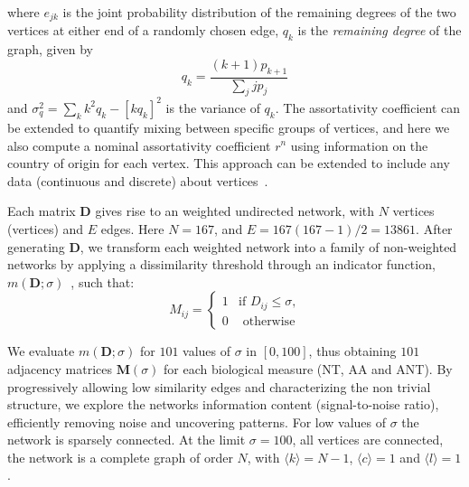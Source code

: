 \documentclass[12pt]{article}
\begin{document}
where $e_{jk}$ is the joint probability distribution of the remaining degrees of the two vertices at either end of a randomly chosen edge, $q_k$ is the \textit{remaining degree} of the graph, given by 
\begin{equation}
 \label{eq:remaining}
 q_k = \frac{(k+1)p_{k+1}}{\sum_jjp_j}
\end{equation}
 and $\sigma_{q}^{2}=\sum_{k}k^2q_k-[kq_k]^2$ is the variance of $q_k$. 
The assortativity coefficient can be extended to quantify mixing between specific groups of vertices, and here we also compute a nominal assortativity coefficient $r^{n}$ using information on the country of origin for each vertex.
This approach can be extended to include any data (continuous and discrete) about vertices~\cite{assort}.

Each matrix $\mathbf{D}$ gives rise to an weighted undirected network, with $N$ vertices (vertices) and $E$ edges.
Here $N=167$, and $E=167(167-1)/2=13861$. After generating $\mathbf{D}$, we transform each weighted network into a family of non-weighted networks by applying a dissimilarity threshold through an indicator function, $m(\mathbf{D};\sigma)$~\cite{GoesNeto2010,Andrade2011}, such that:
\begin{equation}
M_{ij} =
\begin{cases} 
1 & \text{if $D_{ij} \leq \sigma$,}
 \\
0 & \text{ otherwise}
\end{cases}
\end{equation}

We evaluate $m(\mathbf{D};\sigma)$ for $101$ values of $\sigma$ in $[0,100]$, thus obtaining $101$ adjacency matrices $\mathbf{M}(\sigma)$ for each biological measure (NT, AA and ANT).
By progressively allowing low similarity edges and characterizing the non trivial structure, we explore the networks information content (signal-to-noise ratio), efficiently removing noise and uncovering patterns. For low values of $\sigma$ the network is sparsely connected. At the limit $\sigma=100$, all vertices are connected, the network is a complete graph of order $N$, with $\langle k \rangle=N-1$, $\langle c \rangle=1$ and $\langle l \rangle=1$.

 
\end{document}
